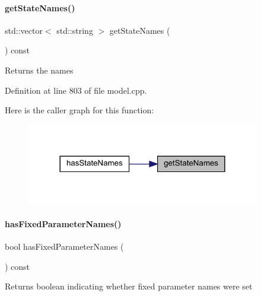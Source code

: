 \paragraph{\texorpdfstring{getStateNames()}{getStateNames()}}
{\footnotesize\ttfamily std\+::vector$<$ std\+::string $>$ get\+State\+Names (\begin{DoxyParamCaption}{ }\end{DoxyParamCaption}) const\hspace{0.3cm}{\ttfamily [virtual]}}

\begin{DoxyReturn}{Returns}
the names 
\end{DoxyReturn}


Definition at line 803 of file model.\+cpp.

Here is the caller graph for this function\+:
\nopagebreak
\begin{figure}[H]
\begin{center}
\leavevmode
\includegraphics[width=288pt]{classamici_1_1_model_af0a035784f9fbea688512f2c7f211b92_icgraph}
\end{center}
\end{figure}
\mbox{\label{classamici_1_1_model_adfe23b552732bba8d8f54298522abf3c}} 
\paragraph{\texorpdfstring{hasFixedParameterNames()}{hasFixedParameterNames()}}
{\footnotesize\ttfamily bool has\+Fixed\+Parameter\+Names (\begin{DoxyParamCaption}{ }\end{DoxyParamCaption}) const\hspace{0.3cm}{\ttfamily [virtual]}}

\begin{DoxyReturn}{Returns}
boolean indicating whether fixed parameter names were set 
\end{DoxyReturn}


